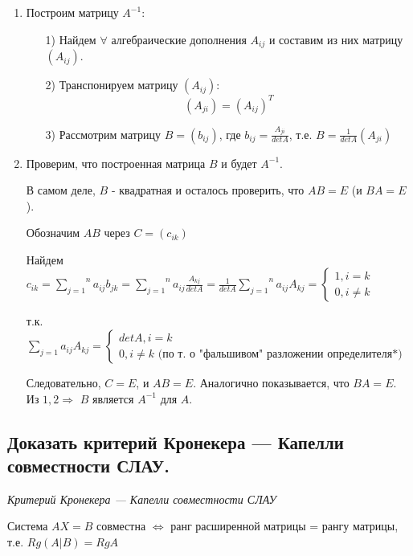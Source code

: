 \begin{enumerate}
    \item Построим матрицу $A^{-1}:$
    \begin{enumerate}
        \item[1)] Найдем $\forall$ алгебраические дополнения $A_{ij}$ и составим из них матрицу $(A_{ij})$.
        \item[2)] Транспонируем матрицу $(A_{ij}):$
    $$(A_{ji}) = (A_{ij})^T$$
        \item[3)] Рассмотрим матрицу $B = (b_{ij})$, где $b_{ij} = \frac{A_{ji}}{detA}$, т.е. $B = \frac{1}{detA}(A_{ji})$
    \end{enumerate}
    \item Проверим, что построенная матрица $B$ и будет $A^{-1}$.

    В самом деле, $B$ - квадратная и осталось проверить, что $AB = E$ (и $BA = E$).

    Обозначим $AB$ через $C = (c_{ik})$

    Найдем $c_{ik} = \overset{n}{\underset{j = 1}{\sum}}a_{ij}b_{jk} = \overset{n}{\underset{j = 1}{\sum}}a_{ij}\frac{A_{kj}}{detA} = \frac{1}{detA}\overset{n}{\underset{j = 1}{\sum}}a_{ij}A_{kj} = \begin{cases}1, i = k\\ 0, i \ne k\end{cases}$ 
    
    т.к. ${\underset{j = 1}{\sum}}a_{ij}A_{kj} = \begin{cases}detA, i = k\\ 0, i \ne k \text{ (по т. о "фальшивом"\ разложении определителя*)}\end{cases}$

    Следовательно, $C = E$, и $AB = E$.
    Аналогично показывается, что $BA = E$.
    Из $1, 2 \Rightarrow$ $B$ является $A^{-1}$ для $A$.

\end{enumerate}

\ep

\subsection{Доказать критерий Кронекера — Капелли совместности СЛАУ.}
\textit{Критерий Кронекера — Капелли совместности СЛАУ}

\vspace*{15pt}

Система $AX = B$ совместна $\iff$ ранг расширенной матрицы = рангу матрицы, т.е. $Rg(A|B) = RgA$

